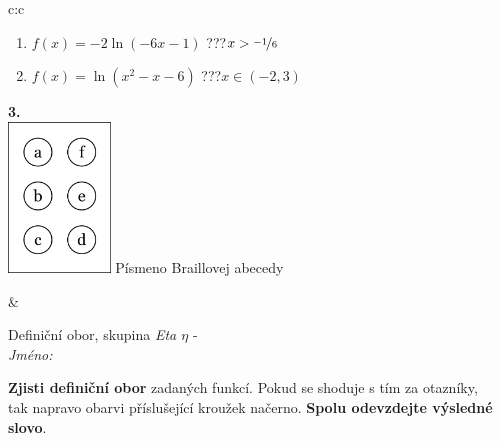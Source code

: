 \documentclass[10pt]{report}
\begin{document}
\begin{tabular}{c:c}
\begin{minipage}[c][104.5mm][t]{0.5\linewidth}
\begin{center}
\begin{minipage}{0.79\linewidth}
\begin{center}
\begin{varwidth}{\linewidth}
\begin{enumerate}
\item $f(x)=-2\ln{(-6x-1)}$\quad \dotfill\; ???\;\dotfill \quad $x>\nicefrac{-1}{6}$
\item $f(x)=\ln{(x^2-x-6)}$\quad \dotfill\; ???\;\dotfill \quad $x\in(-2 , 3)$
\end{enumerate}
\end{varwidth}
\end{center}
\end{minipage}
\begin{minipage}{0.20\linewidth}
\begin{center}
{\Huge\bfseries 3.} \\[2mm]
\includegraphics[height=40mm]{../images/braille.png}
{\small Písmeno Braillovej abecedy}
\end{center}
\end{minipage}
\end{center}
\end{minipage}
&
\begin{minipage}[c][104.5mm][t]{0.5\linewidth}
\begin{center}
\vspace{7mm}
{\huge Definiční obor, skupina \textit{Eta $\eta$} -}\\[5mm]
\textit{Jméno:}\phantom{xxxxxxxxxxxxxxxxxxxxxxxxxxxxxxxxxxxxxxxxxxxxxxxxxxxxxxxxxxxxxxxxx}\\[5mm]
\begin{minipage}{0.95\linewidth}
\begin{center}
\textbf{Zjisti definiční obor} zadaných funkcí. Pokud se shoduje s tím za otazníky,\\tak napravo obarvi příslušející kroužek načerno. \textbf{Spolu odevzdejte výsledné slovo}.
\end{center}
\end{minipage}
\\[1mm]
\begin{minipage}{0.79\linewidth}
\begin{center}
\begin{varwidth}{\linewidth}
\begin{enumerate}
\normalsizerrr

\end{enumerate}
\end{varwidth}
\end{center}
\end{minipage}
\end{center}
\end{minipage}
\end{tabular}
\end{document}

